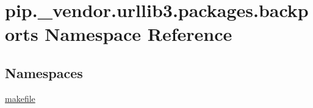 \hypertarget{namespacepip_1_1__vendor_1_1urllib3_1_1packages_1_1backports}{}\section{pip.\+\_\+vendor.\+urllib3.\+packages.\+backports Namespace Reference}
\label{namespacepip_1_1__vendor_1_1urllib3_1_1packages_1_1backports}
\subsection*{Namespaces}
\begin{DoxyCompactItemize}
\item 
 \hyperlink{namespacepip_1_1__vendor_1_1urllib3_1_1packages_1_1backports_1_1makefile}{makefile}
\end{DoxyCompactItemize}
